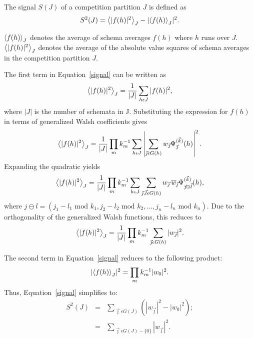 \begin{definition}
The signal $S(J)$ of a competition partition $J$ is defined as
\begin{equation}
S^2(J)={\left\langle |f(h)|^2 \right\rangle}_J-|{\left\langle f(h) \right\rangle}_J|^2.
	\label{signal}
\end{equation}
\end{definition}
${\left\langle f(h) \right\rangle}_J$ denotes the average of schema averages $f(h)$ where
$h$ runs over $J$.  ${\left\langle |f(h)|^2 \right\rangle}_J$ denotes the average of the
absolute value squares of schema averages in the competition partition $J$.

The first term in Equation~\ref{signal} can be written as
\begin{equation}
{\left\langle |f(h)|^2 \right\rangle}_J=\frac{1}{|J|}\sum_{h \epsilon J}{|f(h)|^2},
\end{equation}
where $|J|$ is the number of schemata in J.  Substituting the
expression for $f(h)$ in terms of generalized Walsh coefficients gives
\begin{equation}
{\left\langle |f(h)|^2 \right\rangle}_J=\frac{1}{|J|} \prod_m{k_m^{-1}}
	\sum_{h \epsilon J}
	\left| \sum_{\vec\jmath \epsilon G(h)}
		{w_{\vec\jmath}
		\Psi^{(\vec k)}_{\vec\jmath}(h)} \right|^2.
\end{equation}
Expanding the quadratic yields
\begin{equation}
{\left\langle |f(h)|^2 \right\rangle}_J=\frac{1}{|J|} \prod_m{k_m^{-1}}
	\sum_{h \epsilon J}
	\sum_{\vec\jmath,\vec l \epsilon G(h)}{
		w_{\vec\jmath}\, \overline{w}_{\vec l}
		\Psi_{\vec\jmath \ominus \vec l}^{(\vec k)}(h)},
\end{equation}
where $j \ominus l=(j_1-l_1 \mbox{\ mod\ } k_1,j_2-l_2 \mbox{\ mod\ } k_2,
\ldots,
        j_n-l_n \mbox{\ mod\ } k_n)$.
Due to the orthogonality of the generalized Walsh functions, this reduces to
\begin{equation}
{\left\langle |f(h)|^2 \right\rangle}_J=\frac{1}{|J|} \prod_m{k_m^{-1}}
	\sum_{\vec\jmath \epsilon G(h)}{|w_{\vec\jmath}|^2}.
\end{equation}

The second term in Equation~\ref{signal} reduces to the following product:
\begin{equation}
|{\left\langle f(h) \right\rangle}_J|^2=\prod_m{k_m^{-1}} |w_0|^2.
\end{equation}
Thus, Equation~\ref{signal} simplifies to:
\begin{eqnarray}
S^2(J)&=&\sum_{\vec\jmath\epsilon G(J)} (|w_{\vec\jmath}|^2-|w_0|^2);
	\nonumber\\
	&=&\sum_{\vec\jmath\epsilon G(J)-\{0\}} |w_{\vec\jmath}|^2.
		\label{signalwalsh}
\end{eqnarray}

